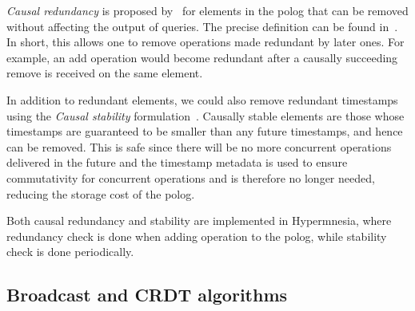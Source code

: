 \emph{Causal redundancy} is proposed by~\citet{baquero2017PureOp} for elements in
the \acrshort{polog} that can be removed without affecting the output of
queries. The precise definition can be found in~\cite{baquero2017PureOp,baquero2014PureOp}. 
In short, this allows one to remove operations made redundant by later ones. For
example, an add operation would become redundant after a causally succeeding remove 
is received on the same element.

In addition to redundant elements, we could also remove redundant timestamps 
using the \emph{Causal stability} formulation~\citet{baquero2017PureOp}.
Causally stable elements are those whose timestamps are guaranteed to be smaller
than any future timestamps, and hence can be removed.
This is safe since there will be no more
concurrent operations delivered in the future and the timestamp metadata is
used to ensure commutativity for concurrent operations and is therefore no longer
needed, reducing the storage cost of the \acrshort{polog}.

Both causal redundancy and stability are implemented in Hypermnesia, where redundancy
check is done when adding operation to the \acrshort{polog}, while stability check 
is done periodically.

\subsection{Broadcast and CRDT algorithms} \label{subsec:impl pawset algorithm}


